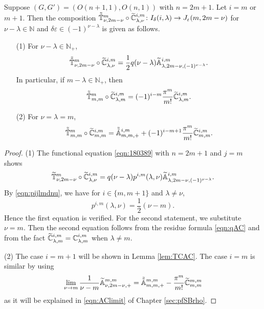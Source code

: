 \begin{proposition}
\label{prop:1803105}
Suppose $(G,G')=(O(n+1,1),O(n,1))$ with $n=2m+1$.  
Let $i=m$ or $m+1$.  
Then the composition $\tilde{\tilde{{\mathbb{T}}}}_{{\nu},{2m-\nu}}^{{m}} \circ \widetilde{{\mathbb{C}}}_{{\lambda},{\nu}}^{{i,m}} \colon I_{\delta}(i,\lambda) \to J_{\varepsilon}(m,2m-\nu)$
 for $\nu-\lambda \in {\mathbb{N}}$
 and $\delta \varepsilon \in (-1)^{\nu-\lambda}$ is given as follows.   
\begin{enumerate}
\item[{\rm{(1)}}]
For $\nu-\lambda \in {\mathbb{N}}_+$, 
\[
  \tilde{\tilde{{\mathbb{T}}}}_{{\nu},{2m-\nu}}^{{m}} \circ \widetilde{{\mathbb{C}}}_{{\lambda},{\nu}}^{{i,m}}
  = 
  \frac 1 2 q(\nu-\lambda) {\widetilde{\mathbb{A}}}_{{\lambda},{2m-\nu},{(-1)^{\nu-\lambda}}}^{{i,m}}.  
\]
In particular,
 if $m-\lambda \in {\mathbb{N}}_+$, 
 then 
\[
  \tilde{\tilde{{\mathbb{T}}}}_{{m},{m}}^{{m}} \circ \widetilde{{\mathbb{C}}}_{{\lambda},{m}}^{{i,m}}
  = 
  (-1)^{i-m} \frac {\pi^m} {m!} \widetilde{{\mathbb{C}}}_{{\lambda},{m}}^{{i,m}}.  
\]

\item[{\rm{(2)}}]
For $\nu=\lambda=m$, 
\[
     \tilde{\tilde{{\mathbb{T}}}}_{{m},{m}}^{{m}} \circ \widetilde{{\mathbb{C}}}_{{m},{m}}^{{i,m}}
  = 
     \tilde{\tilde{{\mathbb{A}}}}_{{m},{m},{+}}^{{i,m}} 
     + (-1)^{i-m+1} \frac{\pi^m}{m!} \widetilde{{\mathbb{C}}}_{{m},{m}}^{{i,m}}.  
\]
\end{enumerate}
\end{proposition}
\begin{proof}
(1)\enspace
The functional equation \eqref{eqn:180389}
 with $n=2m+1$ and $j=m$ shows
\[
   \widetilde{{\mathbb{T}}}_{{\nu},{2m-\nu}}^{{m}} \circ \widetilde{{\mathbb{C}}}_{{\lambda},{\nu}}^{{i,m}}
  = 
  q(\nu-\lambda) p^{i,m}(\lambda,\nu) {\widetilde{\mathbb{A}}}_{{\lambda},{2m-\nu},{(-1)^{\nu-\lambda}}}^{{i,m}}.  
\]
By \eqref{eqn:pijlmdnu}, 
 we have for $i \in \{m,m+1\}$ and $\lambda \ne \nu$, 
\[
  p^{i,m}(\lambda,\nu) = \frac 1 2 (\nu-m).  
\]
Hence the first equation is verified.  
For the second statement, 
 we substitute $\nu=m$.  
Then the second equation follows from the residue formula \eqref{eqn:qAC}
 and from the fact 
 $\widetilde{{\mathbb{C}}}_{{\lambda},{m}}^{{i,m}}={\mathbb{C}}_{{\lambda},{m}}^{{i,m}}$
 when $\lambda \ne m$.  
\par\noindent
(2)\enspace
The case $i=m+1$ will be shown in Lemma \ref{lem:TCAC}.  
The case $i=m$ is similar by using
\[
     \lim_{\nu \to m} \frac 1 {\nu-m} {\widetilde{\mathbb{A}}}_{{\nu},{2m-\nu},{+}}^{{m, m}}
     = 
     \tilde{\tilde{{\mathbb{A}}}}_{{m},{m},{+}}^{{m,m}}
     - \frac{\pi^m}{m!} \widetilde{{\mathbb{C}}}_{{m},{m}}^{{m,m}} 
\]
as it will be explained in \eqref{eqn:AClimit} of Chapter \ref{sec:pfSBrho}.  
\end{proof}


